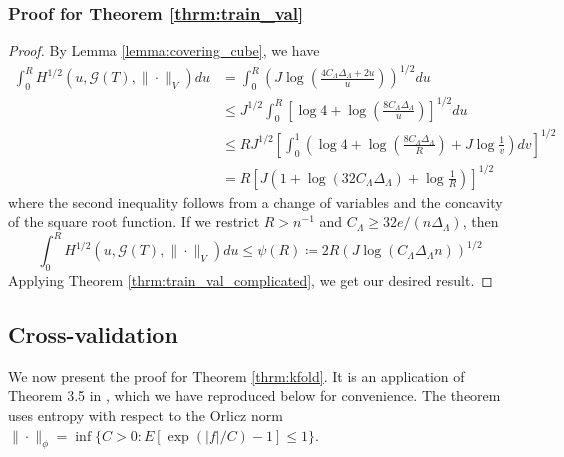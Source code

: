 \documentclass[12pt]{article}
\begin{document}
\subsubsection{Proof for Theorem \ref{thrm:train_val}}
\begin{proof}
	By Lemma \ref{lemma:covering_cube}, we have
	\begin{align}
	 \int_{0}^{R}H^{1/2}(u,\mathcal{G}(T),\|\cdot\|_{V})du 
	&= \int_{0}^{R} \left ( 
	J \log \left(\frac{4C_\Lambda\Delta_{\Lambda}+2u}{u}\right)
	\right )^{1/2}
	du\\
	& \le J^{1/2}\int_{0}^{R}\left[\log4+\log\left(\frac{8C_\Lambda\Delta_{\Lambda}}{u}\right)\right]^{1/2}du\\
	& \le RJ^{1/2}\left[\int_{0}^{1}\left(\log4+\log\left(\frac{8C_\Lambda\Delta_{\Lambda}}{R}\right)+J\log\frac{1}{v}\right)dv\right]^{1/2}\\
	&=
	R\left[J \left (
	1+\log \left (32C_\Lambda\Delta_{\Lambda}\right)
	+ \log\frac{1}{R} 
	\right )
	\right]^{1/2}
	\end{align}
	where the second inequality follows from a change of variables and the concavity of the square root function. If we restrict $R > n^{-1}$ and $C_\Lambda \ge 32e/(n \Delta_{\Lambda})$, then 
	\begin{equation}
	\label{eq:train_val_entropy}
	\int_{0}^{R}H^{1/2}(u,\mathcal{G}(T),\|\cdot\|_{V})du
	\le
	\psi (R) \coloneqq 2 R\left ( J \log(C_\Lambda \Delta_{\Lambda} n) \right )^{1/2}
	\end{equation}
	Applying Theorem \ref{thrm:train_val_complicated}, we get our desired result.
\end{proof}

\subsection{Cross-validation}
\label{app:cv}
We now present the proof for Theorem \ref{thrm:kfold}. It is an application of Theorem 3.5 in \citet{lecue2012oracle}, which we have reproduced below for convenience. The theorem uses entropy with respect to the Orlicz norm $\| \cdot \|_{\phi} = \inf \{ C > 0: E[\exp(|f|/C) - 1] \le 1 \}$.
\end{document}
